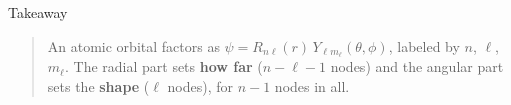 \documentclass[
  ignorenonframetext,
  aspectratio=169,
  handout]{beamer}
\begin{document}
\begin{frame}{Takeaway}
\protect{}\label{takeaway}
\begin{quote}
An atomic orbital factors as
\(\psi = R_{n\ell}(r)\,Y_{\ell m_\ell}(\theta,\phi)\), labeled by \(n\),
\(\ell\), \(m_\ell\). The radial part sets \textbf{how far}
(\(n - \ell - 1\) nodes) and the angular part sets the \textbf{shape}
(\(\ell\) nodes), for \(n - 1\) nodes in all.
\end{quote}
\end{frame}
\end{document}

